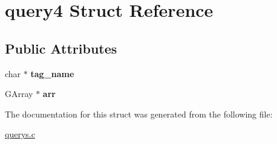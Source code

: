\hypertarget{structquery4}{}\section{query4 Struct Reference}
\label{structquery4}
\subsection*{Public Attributes}
\begin{DoxyCompactItemize}
\item 
char $\ast$ {\bfseries tag\+\_\+name}\hypertarget{structquery4_a264f7982f7482d2031e54f642a24c0d8}{}\label{structquery4_a264f7982f7482d2031e54f642a24c0d8}

\item 
G\+Array $\ast$ {\bfseries arr}\hypertarget{structquery4_aa7080987a490e82ddce657adb6fdbe1b}{}\label{structquery4_aa7080987a490e82ddce657adb6fdbe1b}

\end{DoxyCompactItemize}


The documentation for this struct was generated from the following file\+:\begin{DoxyCompactItemize}
\item 
\hyperlink{querys_8c}{querys.\+c}\end{DoxyCompactItemize}

